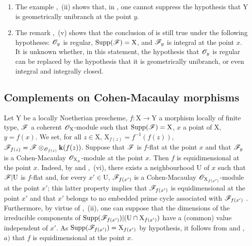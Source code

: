 \begin{remarks}[15.3.4]
\label{IV.15.3.4}
\begin{enumerate}[label=(\roman*)]
  \item The example ,~(ii) shows that, in , one cannot suppress the hypothesis that $\mathrm{Y}$ is geometrically unibranch at the point $y$.
  \item The remark ,~(v) shows that the conclusion of  is still true under the following hypotheses: $\mathscr{O}_y$ is regular, $\operatorname{Supp}(\mathscr{F})=\mathrm{X}$, and $\mathscr{F}_y$ is integral at the point $x$.
It is unknown whether, in this statement, the hypothesis that $\mathscr{O}_y$ is regular can be replaced by the hypothesis that it is geometrically unibranch, or even integral and integrally closed.
\end{enumerate}
\end{remarks}

\subsection{Complements on Cohen-Macaulay morphisms}
\label{subsection:IV.15.4}

\begin{proposition}[15.4.1]
\label{IV.15.4.1}
Let $\mathrm{Y}$ be a locally Noetherian prescheme, $f:\mathrm{X}\to\mathrm{Y}$ a morphism locally of finite type, $\mathscr{F}$ a coherent $\mathscr{O}_\mathrm{X}$-module such that $\operatorname{Supp}(\mathscr{F})=\mathrm{X}$, $x$ a point of $\mathrm{X}$, $y=f(x)$.
We set, for all $z\in\mathrm{X}$, $\mathrm{X}_{f(z)}=f^{-1}(f(z))$, $\mathscr{F}_{f(z)}=\mathscr{F}\otimes_{\mathscr{O}_{f(z)}}\mathbf{k}(f(z))$.
Suppose that $\mathscr{F}$ is $f$-flat at the point $x$ and that $\mathscr{F}_y$ is a Cohen-Macaulay $\mathscr{O}_{\mathrm{X}_y}$-module at the point $x$.
Then $f$ is
equidimensional at the point $x$.
Indeed, by  and ,~(vi), there exists a neighbourhood $\mathrm{U}$ of $x$ such that $\mathscr{F}|\mathrm{U}$ is $f$-flat and, for every $x'\in\mathrm{U}$, $\mathscr{F}_{f(x')}$ is a Cohen-Macaulay $\mathscr{O}_{\mathrm{X}_{f(x')}}$-module at the point $x'$; this latter property implies that $\mathscr{F}_{f(x')}$ is equidimensional at the point $x'$ and that $x'$ belongs to no embedded prime cycle associated with $\mathscr{F}_{f(x')}$ .
Furthermore, by virtue of ,~(ii), one can suppose that the dimensions of the irreducible components of $\operatorname{Supp}(\mathscr{F}_{f(x')})|(\mathrm{U}\cap\mathrm{X}_{f(x')})$ have a (common) value independent of $x'$.
As $\operatorname{Supp}(\mathscr{F}_{f(x')})=\mathrm{X}_{f(x')}$ by hypothesis, it follows from  and ,~$a)$ that $f$ is equidimensional at the point $x$.
\end{proposition}

